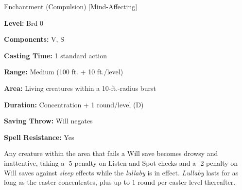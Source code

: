 
Enchantment (Compulsion) [Mind-Affecting]

\textbf{Level:} Brd 0

\textbf{Components:} V, S

\textbf{Casting Time:} 1 standard action

\textbf{Range:} Medium (100 ft. + 10 ft./level)

\textbf{Area:} Living creatures within a 10-ft.-radius burst

\textbf{Duration:} Concentration + 1 round/level (D)

\textbf{Saving Throw:} Will negates

\textbf{Spell Resistance:} Yes

Any creature within the area that fails a Will save becomes drowsy and inattentive, 
taking a -5 penalty on Listen and Spot checks and a -2 penalty on Will saves against 
\textit{sleep} effects while the \textit{lullaby} is in effect. \textit{Lullaby 
}lasts for as long as the caster concentrates, plus up to 1 round per caster level 
thereafter.




